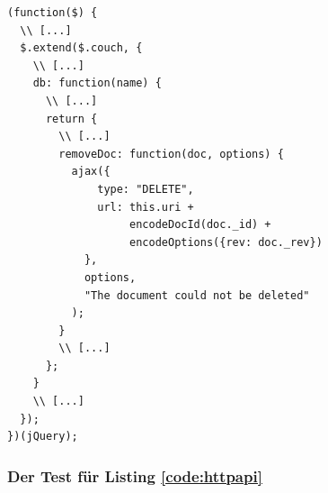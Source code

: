 \lstset{language=javascript}
\medskip 
\begin{lstlisting}[label=code:httpapi, caption=Auszug aus {\fontfamily{pcr}\selectfont /share/www/script/jquery.couch.js}]
(function($) {
  \\ [...]
  $.extend($.couch, {
    \\ [...]
    db: function(name) {
      \\ [...]
      return {
        \\ [...]
        removeDoc: function(doc, options) {
          ajax({
              type: "DELETE",
              url: this.uri +
                   encodeDocId(doc._id) +
                   encodeOptions({rev: doc._rev})
            },
            options,
            "The document could not be deleted"
          );
        }
        \\ [...]
      };
    }
    \\ [...]
  });
})(jQuery);
\end{lstlisting}


\subsubsection{Der Test f\"ur Listing \ref{code:httpapi}}
\label{subsec:testsuite-jspec-code}

